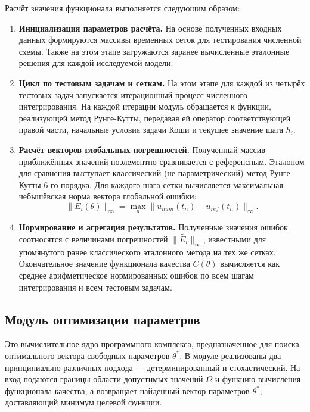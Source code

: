 Расчёт значения функционала выполняется следующим образом:
\begin{enumerate}
	\item \textbf{Инициализация параметров расчёта.} На основе полученных входных данных формируются массивы временных сеток для тестирования численной схемы. Также на этом этапе загружаются заранее вычисленные эталонные решения для каждой исследуемой модели.
	\item \textbf{Цикл по тестовым задачам и сеткам.} На этом этапе для каждой из четырёх тестовых задач запускается итерационный процесс численного интегрирования. На каждой итерации модуль обращается к функции, реализующей метод Рунге-Кутты, передавая ей оператор соответствующей правой части, начальные условия задачи Коши и текущее значение шага $h_i$.
	\item \textbf{Расчёт векторов глобальных погрешностей.} Полученный массив приближённых значений поэлементно сравнивается с референсным. Эталоном для сравнения выступает классический (не параметрический) метод Рунге-Кутты 6-го порядка. Для каждого шага сетки вычисляется максимальная чебышёвская норма вектора глобальной ошибки:
	\begin{equation*}
		\| E_i(\theta)\|_{\infty} = \max_n \|u_{num}(t_n) - u_{ref}(t_n) \|_{\infty}.
	\end{equation*}
	\item \textbf{Нормирование и агрегация результатов.} Полученные значения ошибок соотносятся с величинами погрешностей $\|\tilde{E_i}\|_{\infty}$, известными для упомянутого ранее классического эталонного метода на тех же сетках. Окончательное значение функционала качества $C(\theta)$ вычисляется как среднее арифметическое нормированных ошибок по всем шагам интегрирования и всем тестовым задачам.
\end{enumerate}

\subsection{Модуль оптимизации параметров}
Это вычислительное ядро программного комплекса, предназначенное для поиска оптимального вектора свободных параметров $\theta^*$. В модуле реализованы два принципиально различных подхода — детерминированный и стохастический. На вход подаются границы области допустимых значений $\Omega$ и функцию вычисления функционала качества, а возвращает найденный вектор параметров $\theta^*$, доставляющий минимум целевой функции.

